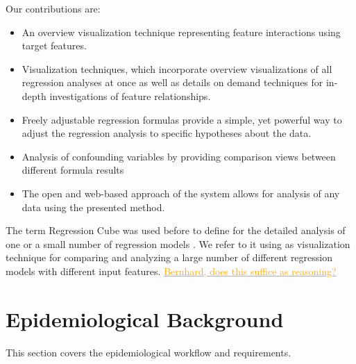 \documentclass[journal]{style/vgtc} 			          %
\newcommand{\com}[1]{\textcolor{orange}{\uline{#1}}}
\begin{document}
Our contributions are:
\begin{itemize}
	\item An overview visualization technique representing feature interactions using target features.
	\item Visualization techniques, which incorporate overview visualizations of all regression analyses at once as well as details on demand techniques for in-depth investigations of feature relationships.
	\item Freely adjustable regression formulas provide a simple, yet powerful way to adjust the regression analysis to specific hypotheses about the data.
	\item Analysis of confounding variables by providing comparison views between different formula results
	\item The open and web-based approach of the system allows for analysis of any data using the presented method.
\end{itemize}
The term Regression Cube was used before to define for the detailed analysis of one or a small number of regression models \cite{Chan, Ahmadi}.
We refer to it using as visualization technique for comparing and analyzing a large number of different regression models with different input features.
\com{Bernhard, does this suffice as reasoning?}

\section{Epidemiological Background} \label{sec:Background}
This section covers the epidemiological workflow and requirements.
\end{document}
